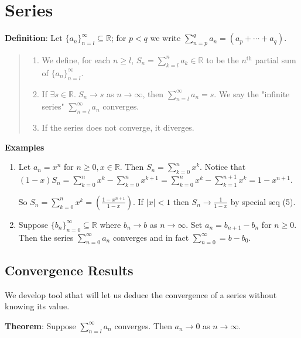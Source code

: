 \documentclass[11pt]{article}
\begin{document}
\section{Series}

\textbf{Definition}: Let $\{a_n\}_{n=l}^\infty \subseteq \mathbb{R}$; for $p < q$ we write $\sum_{n=p}^q a_n = (a_p + \cdots + a_q)$.
\begin{quote}\vspace{-0.3cm}
	\begin{enumerate}
	\item We define, for each $n \geq l$, $S_n = \sum\limits_{k=l}^n a_k \in \mathbb{R}$ to be the $n^\text{th}$ partial sum of $\{a_n\}_{n=l}^\infty$.
	\item If $\exists s \in \mathbb{R}.\; S_n \to s$ as $n \to \infty$, then $\sum_{n=l}^\infty a_n = s$. We say the "infinite series" $\sum_{n=l}^\infty a_n$ converges.
	\item If the series does not converge, it diverges.
	\end{enumerate}
\end{quote}

\textbf{Examples}
\begin{enumerate}\vspace{-0.3cm}
	\item Let $a_n = x^n$ for $n \geq 0, x \in \mathbb{R}$. Then $S_n = \sum_{k=0}^n x^k$. Notice that $(1-x)S_n = \sum_{k=0}^n x^k - \sum_{k=0}^n x^{k+1} = \sum_{k=0}^n x^k - \sum_{k=1}^{n+1} x^k = 1-x^{n+1}$.

So $S_n = \sum_{k=0}^n x^k = (\frac{1-x^{n+1}}{1-x})$. If $|x| < 1$ then $S_n \to \frac{1}{1-x}$ by special seq (5).

	\item Suppose $\{b_n\}_{n=0}^\infty \subseteq \mathbb{R}$ where $b_n \to b$ as $n \to \infty$. Set $a_n = b_{n+1}-b_n$ for $n \geq 0$. Then the series $\sum_{n=0}^\infty a_n$ converges and in fact $\sum_{n=0}^\infty = b - b_0$.
\end{enumerate}

\subsection{Convergence Results}

We develop tool sthat will let us deduce the convergence of a series without knowing its value.

\textbf{Theorem}: Suppose $\sum_{n=l}^\infty a_n$ converges. Then $a_n \to 0$ as $n \to \infty$.
\end{document}
